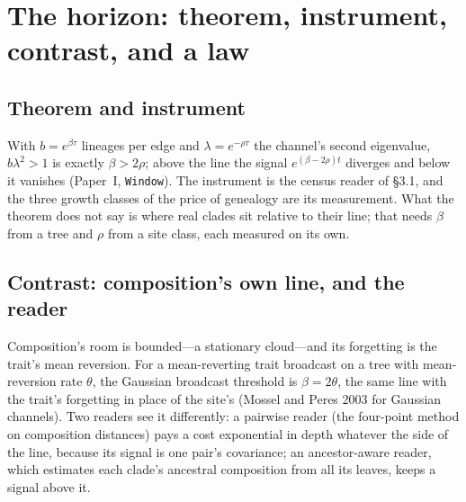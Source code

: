 \documentclass[11pt]{article}
\begin{document}
\section{The horizon: theorem, instrument, contrast, and a law}

\subsection{Theorem and instrument}

With $b=e^{\beta\tau}$ lineages per edge and $\lambda=e^{-\rho\tau}$ the channel's second eigenvalue, $b\lambda^2>1$ is exactly $\beta>2\rho$; above the line the signal $e^{(\beta-2\rho)t}$ diverges and below it vanishes (Paper~I, \texttt{Window}). The instrument is the census reader of \S3.1, and the three growth classes of the price of genealogy are its measurement. What the theorem does not say is where real clades sit relative to their line; that needs $\beta$ from a tree and $\rho$ from a site class, each measured on its own.

\subsection{Contrast: composition's own line, and the reader}

Composition's room is bounded---a stationary cloud---and its forgetting is the trait's mean reversion. For a mean-reverting trait broadcast on a tree with mean-reversion rate $\theta$, the Gaussian broadcast threshold is $\beta=2\theta$, the same line with the trait's forgetting in place of the site's (Mossel and Peres 2003 for Gaussian channels). Two readers see it differently: a pairwise reader (the four-point method on composition distances) pays a cost exponential in depth whatever the side of the line, because its signal is one pair's covariance; an ancestor-aware reader, which estimates each clade's ancestral composition from all its leaves, keeps a signal above it.
\end{document}
